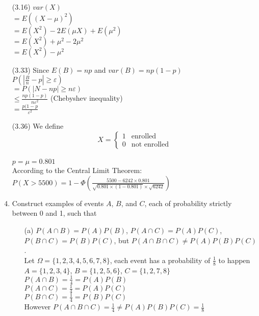 \documentclass[letterpaper,12pt]{article}
\theoremstyle{definition}
\begin{document}
\begin{enumerate}
			\item[(3.16)]
			$var(X)$\\
			$= E((X - \mu)^2)$\\
			$= E(X^2) - 2E(\mu X) + E(\mu^2)$\\
			$= E(X^2) + \mu^2 - 2\mu^2$\\
			$= E(X^2) - \mu^2$


			\item[(3.33)]
			Since $E(B) = np$ and $var(B) = np(1 - p)$\\
			$P(|\frac{B}{n} - p| \geq \varepsilon)$\\
			$= P(|N - np| \geq n\varepsilon)$\\
			$\leq \frac{np(1-p)}{n\varepsilon^2}$ (Chebyshev inequality)\\
			$= \frac{p(1-p}{\varepsilon^2}$\\

			\item[(3.36)]
			We define  
			 \begin{equation}
			       X = 
			        \begin{cases}
			            1 & \text{enrolled} \\
			            0 & \text{not enrolled}
			        \end{cases}
 			   \end{equation}\\
			$p = \mu = 0.801$\\
			According to the Central Limit Theorem:
			$P(X > 5500) = 1 - \Phi (\frac{5500 - 6242\times 0.801}{\sqrt{0.801\times (1 - 0.801)} \times \sqrt{6242}})$
	\item Construct examples of events $A$, $B$, and $C$, each of probability strictly between 0 and 1, such that
   		\begin{itemize}
			\item[(a)] $P(A  \cap B) = P(A)P(B)$, $P(A  \cap C) = P(A)P(C)$, $P(B  \cap C) = P(B)P(C)$, but $P(A  \cap B \cap C) \neq P(A)P(B)P(C)$.\\
			Let $\Omega = \{ 1, 2, 3, 4, 5, 6, 7, 8\}$, each event has a probability of $\frac{1}{8}$ to happen\\
			$A = \{1, 2, 3, 4\}$,
			$B = \{1, 2, 5, 6\}$,
			$C = \{1, 2, 7, 8\}$\\
			$P(A \cap B) = \frac{1}{4} = P(A)P(B)$\\
			$P(A \cap C) = \frac{1}{4} = P(A)P(C)$\\
			$P(B \cap C) = \frac{1}{4} = P(B)P(C)$\\
			However $P(A\cap B \cap C) = \frac{1}{4}  \neq  P(A) P(B)P(C) = \frac{1}{8}$\\
						

\end{itemize}
\end{enumerate}
\end{document}
